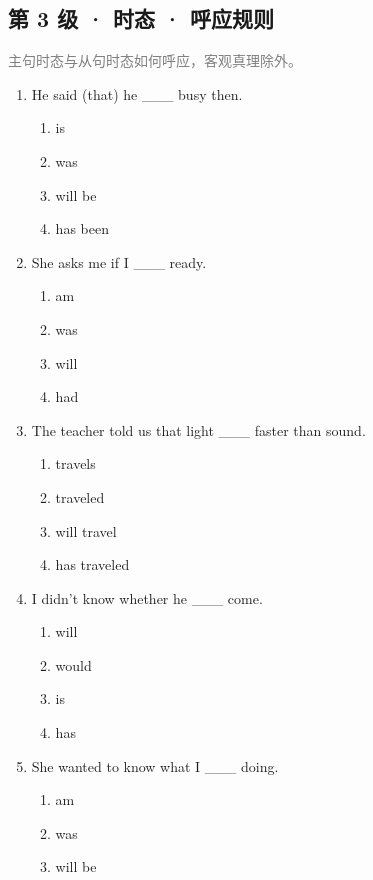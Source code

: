 \documentclass[11pt,a4paper]{ctexart}
\begin{document}
\subsection*{第 3 级 · 时态 · 呼应规则}
\noindent\textcolor{gray}{主句时态与从句时态如何呼应，客观真理除外。}\par\smallskip
\begin{enumerate}[leftmargin=*,itemsep=4pt]
\item He said (that) he \_\_\_ busy then.
\begin{enumerate}[label=\Alph*.,leftmargin=2em,itemsep=1pt,topsep=2pt]
\item is
\item was
\item will be
\item has been
\end{enumerate}
\item She asks me if I \_\_\_ ready.
\begin{enumerate}[label=\Alph*.,leftmargin=2em,itemsep=1pt,topsep=2pt]
\item am
\item was
\item will
\item had
\end{enumerate}
\item The teacher told us that light \_\_\_ faster than sound.
\begin{enumerate}[label=\Alph*.,leftmargin=2em,itemsep=1pt,topsep=2pt]
\item travels
\item traveled
\item will travel
\item has traveled
\end{enumerate}
\item I didn't know whether he \_\_\_ come.
\begin{enumerate}[label=\Alph*.,leftmargin=2em,itemsep=1pt,topsep=2pt]
\item will
\item would
\item is
\item has
\end{enumerate}
\item She wanted to know what I \_\_\_ doing.
\begin{enumerate}[label=\Alph*.,leftmargin=2em,itemsep=1pt,topsep=2pt]
\item am
\item was
\item will be

\end{enumerate}
\end{enumerate}
\end{document}
